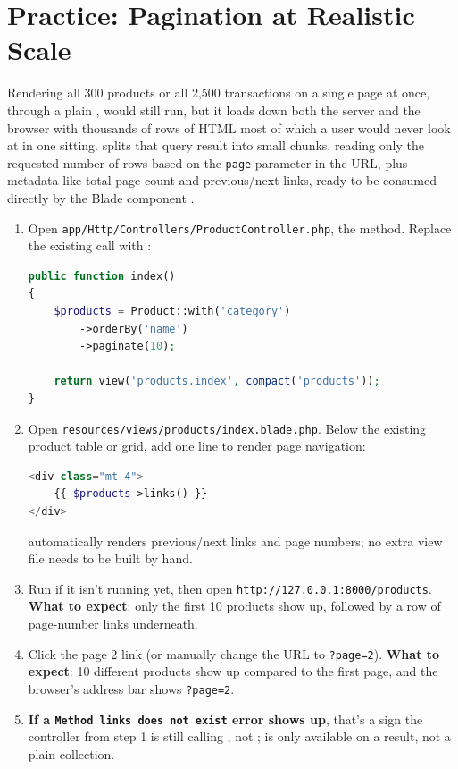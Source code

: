 \section{Practice: Pagination at Realistic Scale}
\label{sec:eloquent-dan-relasi-3}

Rendering all 300 products or all 2,500 transactions on a single page
at once, through a plain , would still run, but it
loads down both the server and the browser with thousands of rows of
HTML most of which a user would never look at in one sitting.
 splits that query result into small chunks,
reading only the requested number of rows based on the \texttt{page}
parameter in the URL, plus metadata like total page count and
previous/next links, ready to be consumed directly by the Blade
component .

\begin{enumerate}
  \item Open \texttt{app/Http/Controllers/ProductController.php}, the
     method. Replace the existing  call
    with :
    \begin{lstlisting}[language=php, title=\lstfile{app/Http/Controllers/ProductController.php}]
public function index()
{
    $products = Product::with('category')
        ->orderBy('name')
        ->paginate(10);

    return view('products.index', compact('products'));
}
    \end{lstlisting}
  \item Open \texttt{resources/views/products/index.blade.php}. Below
    the existing product table or grid, add one line to render page
    navigation:
    \begin{lstlisting}[language=php, title=\lstfile{resources/views/products/index.blade.php}]
<div class="mt-4">
    {{ $products->links() }}
</div>
    \end{lstlisting}
     automatically renders
    previous/next links and page numbers; no extra view file needs to
    be built by hand.
  \item Run  if it isn't running yet, then
    open \texttt{http://127.0.0.1:8000/products}. \textbf{What to
    expect}: only the first 10 products show up, followed by a row of
    page-number links underneath.
  \item Click the page 2 link (or manually change the URL to
    \texttt{?page=2}). \textbf{What to expect}: 10 different products
    show up compared to the first page, and the browser's address bar
    shows \texttt{?page=2}.
  \item \textbf{If a \texttt{Method links does not exist} error shows
    up}, that's a sign the controller from step 1 is still calling
    , not ;  is
    only available on a  result, not a plain
    collection.
\end{enumerate}

